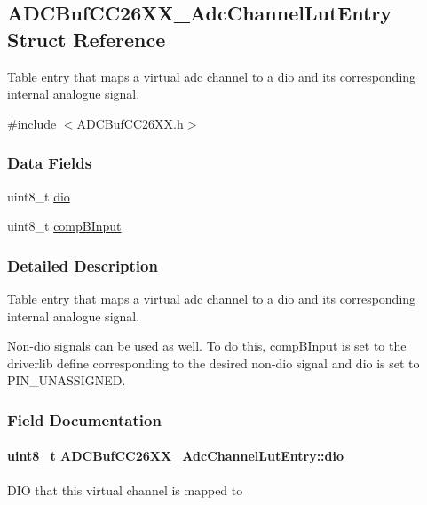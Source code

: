 \subsection{A\+D\+C\+Buf\+C\+C26\+X\+X\+\_\+\+Adc\+Channel\+Lut\+Entry Struct Reference}
\label{struct_a_d_c_buf_c_c26_x_x___adc_channel_lut_entry}


Table entry that maps a virtual adc channel to a dio and its corresponding internal analogue signal.  




{\ttfamily \#include $<$A\+D\+C\+Buf\+C\+C26\+X\+X.\+h$>$}

\subsubsection*{Data Fields}
\begin{DoxyCompactItemize}
\item 
uint8\+\_\+t \hyperlink{struct_a_d_c_buf_c_c26_x_x___adc_channel_lut_entry_a3b714f5a5ebc9e74dbab4157fbba1224}{dio}
\item 
uint8\+\_\+t \hyperlink{struct_a_d_c_buf_c_c26_x_x___adc_channel_lut_entry_a19d95582232ec92376195e302f7263b6}{comp\+B\+Input}
\end{DoxyCompactItemize}


\subsubsection{Detailed Description}
Table entry that maps a virtual adc channel to a dio and its corresponding internal analogue signal. 

Non-\/dio signals can be used as well. To do this, comp\+B\+Input is set to the driverlib define corresponding to the desired non-\/dio signal and dio is set to P\+I\+N\+\_\+\+U\+N\+A\+S\+S\+I\+G\+N\+E\+D. 

\subsubsection{Field Documentation}
\paragraph[{dio}]{\setlength{\rightskip}{0pt plus 5cm}uint8\+\_\+t A\+D\+C\+Buf\+C\+C26\+X\+X\+\_\+\+Adc\+Channel\+Lut\+Entry\+::dio}\label{struct_a_d_c_buf_c_c26_x_x___adc_channel_lut_entry_a3b714f5a5ebc9e74dbab4157fbba1224}
D\+I\+O that this virtual channel is mapped to 
